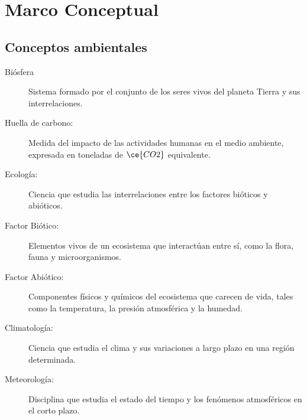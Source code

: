 \section{Marco Conceptual}
\label{sec:marco_conceptual}
\subsection{Conceptos ambientales}
    \begin{description}
        \item[Biósfera] Sistema formado por el conjunto de los seres vivos del planeta Tierra y sus interrelaciones.
        \item[Huella de carbono:] Medida del impacto de las actividades humanas en el medio ambiente, expresada en toneladas de $\ce{CO2}$ equivalente. %
        \item[Ecología:] Ciencia que estudia las interrelaciones entre los factores bióticos y abióticos. %
        \item[Factor Biótico:] Elementos vivos de un ecosistema que interactúan entre sí, como la flora, fauna y microorganismos. %
        \item[Factor Abiótico:] Componentes físicos y químicos del ecosistema que carecen de vida, tales como la temperatura, la presión atmosférica y la humedad. %
        \item[Climatología:] Ciencia que estudia el clima y sus variaciones a largo plazo en una región determinada. %
        \item[Meteorología:] Disciplina que estudia el estado del tiempo y los fenómenos atmosféricos en el corto plazo. %

\end{description}
